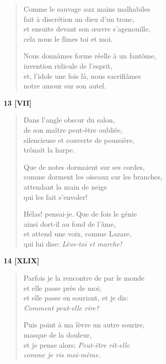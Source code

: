 \begin{verse}
  Comme le sauvage aux mains malhabiles \\
  fait à discrétion un dieu d'un tronc, \\
  et ensuite devant son œuvre s'agenouille, \\
  cela nous le fîmes toi et moi.

  Nous donnâmes forme réelle à un fantôme, \\
  invention ridicule de l'esprit, \\
  et, l'idole une fois là, nous sacrifiâmes \\
  notre amour sur son autel.
\end{verse}

\pagebreak

\begin{center}
  \textbf{13 [VII]}
\end{center}

\begin{verse}
  Dans l'angle obscur du salon, \\
  de son maître peut-être oubliée, \\
  silencieuse et couverte de poussière, \\
  trônait la harpe.

  Que de notes dormaient sur ses cordes, \\
  comme dorment les oiseaux sur les branches, \\
  attendant la main de neige \\
  qui les fait s'envoler!

  Hélas! pensai-je. Que de fois le génie \\
  ainsi dort-il au fond de l'âme, \\
  et attend une voix, comme Lazare, \\
  qui lui dise: \emph{Lève-toi et marche!}
\end{verse}

\bigskip

\begin{center}
  \textbf{14 [XLIX]}
\end{center}

\begin{verse}
  Parfois je la rencontre de par le monde \\
  et elle passe près de moi; \\
  et elle passe en souriant, et je dis: \\
  \emph{Comment peut-elle \emph{rire}?}

  Puis point à ma lèvre un autre sourire, \\
  masque de la douleur, \\
  et je pense alors: \emph{Peut-être rit-elle \\
  comme je ris moi-même.}
\end{verse}


